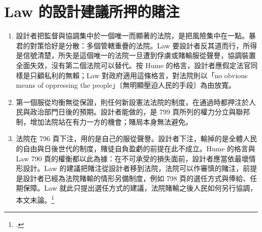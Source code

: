 \section{Law 的設計建議所押的賭注}
\label{sec:30_designer-4}

\begin{enumerate}
\tightlist
\item
  設計者把監督與協調集中於一個唯一而顯著的法院，是把風險集中在一點。暴君的對策恰好是分散：多個管轄重疊的法院。Law 要設計者反其道而行，所得是信號清楚，所失是這個唯一的法院一旦遭到俘虜或賭輸服從聲譽，協調裝置全面失效，沒有第二個法院可以替代。按 Hume 的格言，設計者應假定法官同樣是只顧私利的無賴；Law 對政府適用這條格言，對法院則以「no obvious means of oppressing the people」〔無明顯壓迫人民的手段〕為由放寬。
\item
  第一個服從均衡無從保證，則任何新設憲法法院的制度，在通過時都押注於人民與政治部門日後的預期。設計者能做的，是 799 頁所列的權力分立與聯邦制，增加法院站在有力一方的機會；賭局本身無法避免。
\item
  法院在 796 頁下注，用的是自己的服從聲譽。設計者下注，輸掉的是全體人民的自由與日後世代的制度，賭徒自負盈虧的前提在此不成立。Hume 的格言與 Law 790 頁的權衡都以此為據：在不可承受的損失面前，設計者應當依最壞情形設計。Law 的建議把賭注從設計者移到法院，法院可以作審慎的賭注，前提是設計者已經為法院賭輸的情形另備制度，例如 798 頁的選任方式與俸給、任期保障。Law 就此只提出選任方式的建議，法院賭輸之後人民如何另行協調，本文未論。\footcite[790, 796--799]{law2009}
\end{enumerate}
